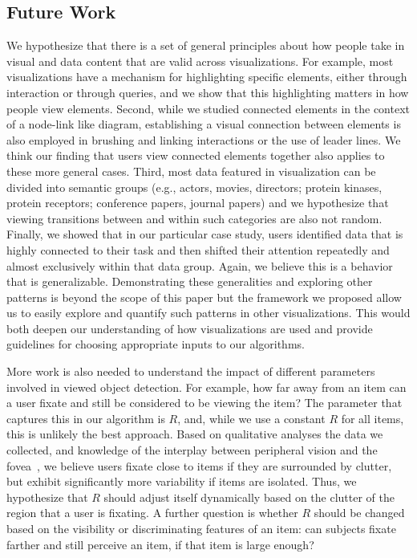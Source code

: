 \subsection{Future Work}
\label{sec:FutureWork}
We hypothesize that there is a set of general principles about how people take in visual and data content that are valid across visualizations. For example, most visualizations have a mechanism for highlighting specific elements, either through interaction or through queries, and we show that this highlighting matters in how people view elements. Second, while we studied connected elements in the context of a node-link like diagram, establishing a visual connection between elements is also employed in brushing and linking interactions or the use of leader lines. We think our finding that users view connected elements together also applies to these more general cases. Third, most data featured in visualization can be divided into semantic groups (e.g., actors, movies, directors; protein kinases, protein receptors; conference papers, journal papers) and we hypothesize that viewing transitions between and within such categories are also not random. Finally, we showed that in our particular case study, users identified data that is highly connected to their task and then shifted their attention repeatedly and almost exclusively within that data group. Again, we believe this is a behavior that is generalizable. Demonstrating these generalities and exploring other patterns is beyond the scope of this paper but the framework we proposed allow us to easily explore and quantify such patterns in other visualizations. This would both deepen our understanding of how visualizations are used and provide guidelines for choosing appropriate inputs to our algorithms. 

More work is also needed to understand the impact of different parameters involved in viewed object detection. For example, how far away from an item can a user fixate and still be considered to be viewing the item? The parameter that captures this in our algorithm is $R$, and, while we use a constant $R$ for all items, this is unlikely the best approach. Based on qualitative analyses the data we collected,  and knowledge of the interplay between peripheral vision and the fovea~\cite{balas2009summary}, we believe users fixate close to items if they are surrounded by clutter,  but exhibit significantly more variability if items are isolated. Thus, we hypothesize that $R$ should adjust itself dynamically based on the clutter of the region that a user is fixating.  A further question is whether $R$ should be changed based on the visibility or discriminating features of an item: can subjects fixate farther and still perceive an item, if that item is large enough?

